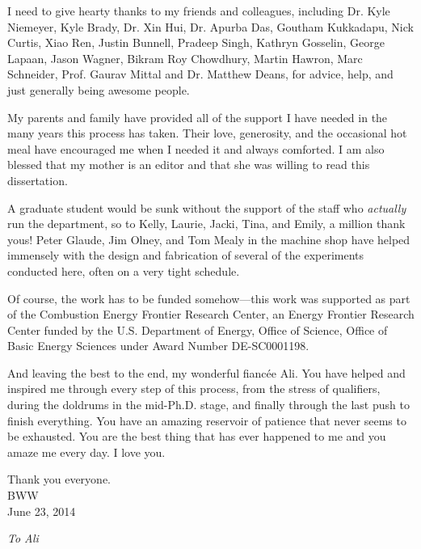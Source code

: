 \documentclass[12pt,letterpaper,oneside,final,openany]{book}
\begin{document}
I need to give hearty thanks to my friends and colleagues,
including Dr. Kyle Niemeyer, Kyle Brady, Dr. Xin Hui,
Dr. Apurba Das, Goutham Kukkadapu, Nick Curtis, Xiao Ren, Justin
Bunnell, Pradeep Singh, Kathryn Gosselin, George Lapaan,
Jason Wagner, Bikram Roy Chowdhury, Martin Hawron, Marc Schneider,
Prof. Gaurav Mittal and Dr. Matthew Deans, for advice,
help, and just generally being awesome people.

My parents and family have provided all of the support I have needed in
the many years this process has taken. Their love, generosity, and the
occasional hot meal have encouraged me when I needed it and always comforted.
I am also blessed that my mother is an editor and that she was willing to read this
dissertation.

A graduate student would be sunk without the support of the staff who
\textit{actually} run the department, so to Kelly, Laurie, Jacki, Tina,
and Emily, a million thank yous! Peter Glaude, Jim Olney, and Tom Mealy in the
machine shop have helped immensely with the design and fabrication of several
of the experiments conducted here, often on a very tight schedule.

Of course, the work has to be funded somehow---this work was supported as
part of the Combustion Energy Frontier Research Center, an Energy Frontier
Research Center funded by the U.S. Department of Energy, Office of Science,
Office of Basic Energy Sciences under Award Number DE-SC0001198.

And leaving the best to the end, my wonderful fiancée Ali. You have helped
and inspired me through every step of this process, from the stress of
qualifiers, during the doldrums in the mid-Ph.D. stage, and finally through
the last push to finish everything. You have an amazing reservoir of patience
that never seems to be exhausted. You are the best thing that has ever
happened to me and you amaze me every day. I love you.

\noindent Thank you everyone.\\
BWW\\
June 23, 2014

\cleardoublepage
{
\vspace*{\fill}
{\large\hfill\textit{To Ali}}
\vspace*{\fill}
}
\cleardoublepage

\begin{singlespace}
\tableofcontents

\cleardoublepage
{}
\listoffigures

\cleardoublepage
{}
\listoftables
\end{singlespace}
\end{document}
